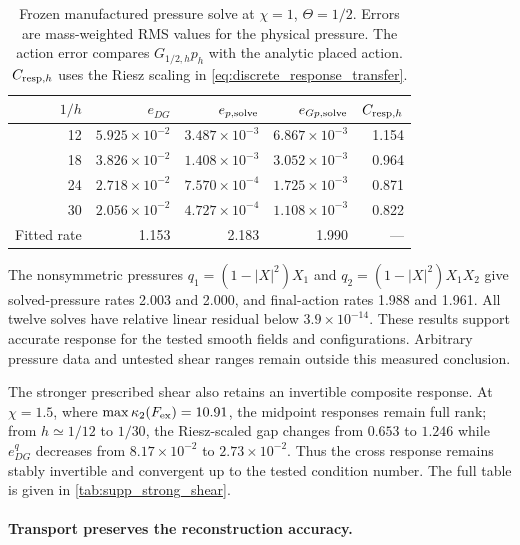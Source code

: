 \documentclass[11pt]{article}
\theoremstyle{plain}
\theoremstyle{definition}
\theoremstyle{remark}
\newcommand{\Th}{\Theta}
\begin{document}
\begin{table}[t]
\centering
\caption{Frozen manufactured pressure solve at $\chi=1$, $\Th=1/2$.
Errors are mass-weighted RMS values for the physical pressure.  The action
error compares $G_{1/2,h}p_h$ with the analytic placed action.
$C_{{\rm resp},h}$ uses the Riesz scaling in
\eqref{eq:discrete_response_transfer}.}
\label{tab:composite_pressure_transfer}
\begin{tabular}{@{}rrrrr@{}}
\toprule
$1/h$ & $e_{DG}$ & $e_{p,\rm solve}$ & $e_{G p,\rm solve}$ & $C_{{\rm resp},h}$ \\
\midrule
12 & $5.925\times10^{-2}$ & $3.487\times10^{-3}$ & $6.867\times10^{-3}$ & 1.154 \\
18 & $3.826\times10^{-2}$ & $1.408\times10^{-3}$ & $3.052\times10^{-3}$ & 0.964 \\
24 & $2.718\times10^{-2}$ & $7.570\times10^{-4}$ & $1.725\times10^{-3}$ & 0.871 \\
30 & $2.056\times10^{-2}$ & $4.727\times10^{-4}$ & $1.108\times10^{-3}$ & 0.822 \\
\midrule
Fitted rate & 1.153 & 2.183 & 1.990 & --- \\
\bottomrule
\end{tabular}
\end{table}

The nonsymmetric pressures $q_1=(1-|X|^2)X_1$ and
$q_2=(1-|X|^2)X_1X_2$ give solved-pressure rates 2.003 and 2.000,
and final-action rates 1.988 and 1.961.  All twelve solves have relative
linear residual below $3.9\times10^{-14}$.  These results support accurate
response for the tested smooth fields and configurations.  Arbitrary pressure
data and untested shear ranges remain outside this measured conclusion.

The stronger prescribed shear also retains an invertible composite response.  At
$\chi=1.5$, where $\max\kappa_2(F_{\rm ex})=10.91$, the midpoint responses
remain full rank; from $h\simeq1/12$ to $1/30$, the Riesz-scaled gap changes
from $0.653$ to $1.246$ while $e_{DG}^q$ decreases from $8.17\times10^{-2}$ to
$2.73\times10^{-2}$.  Thus the cross response remains stably invertible and
convergent up to the tested condition number.  The full table is given in
\cref{tab:supp_strong_shear}.

\paragraph{Transport preserves the reconstruction accuracy.}
\end{document}
